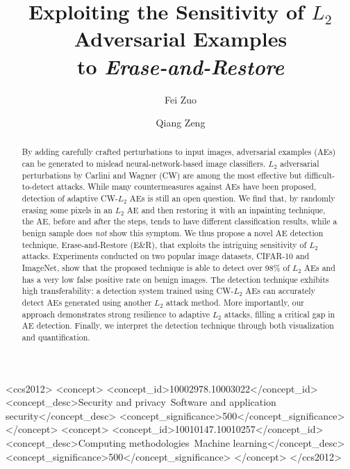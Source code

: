 \documentclass[sigconf]{acmart}
\begin{document}
\fancyhead{}
\title{Exploiting the Sensitivity of $L_2$ Adversarial Examples \\ to \emph{Erase-and-Restore}}




\author{Fei Zuo}

\author{Qiang Zeng}




\begin{abstract}

By adding carefully crafted perturbations to input images, adversarial examples (AEs) can be generated to mislead neural-network-based image classifiers. 
$L_2$ adversarial perturbations by Carlini and Wagner (CW)
   are among the most effective but difficult-to-detect attacks.
   While many countermeasures against AEs have been proposed, 
   detection of adaptive CW-$L_2$ AEs is still an open question.
We find that,
   by randomly erasing some pixels in an $L_2$ AE and then restoring it with an inpainting technique, the AE, before and after the steps, tends to have different classification results, while a benign sample does \emph{not} show this symptom. 
We thus propose a novel AE detection technique, Erase-and-Restore (E\&R), that exploits the intriguing sensitivity of $L_2$ attacks. 
   Experiments conducted on two popular image datasets, CIFAR-10 and ImageNet, show that the proposed technique is able to detect over 98\% of $L_2$ AEs  and has a very low false positive rate on benign images. The detection technique exhibits high transferability: a detection system trained using CW-$L_2$ AEs can accurately  detect AEs generated using another $L_2$ attack method.
   More importantly, our approach demonstrates strong resilience to adaptive $L_2$ attacks, filling a critical gap
   in AE detection. 
   Finally, we interpret the detection technique through both visualization and quantification.

\end{abstract}



\begin{CCSXML}
<ccs2012>
   <concept>
       <concept_id>10002978.10003022</concept_id>
       <concept_desc>Security and privacy~Software and application security</concept_desc>
       <concept_significance>500</concept_significance>
       </concept>
   <concept>
       <concept_id>10010147.10010257</concept_id>
       <concept_desc>Computing methodologies~Machine learning</concept_desc>
       <concept_significance>500</concept_significance>
       </concept>
 </ccs2012>
\end{CCSXML}
\end{document}
